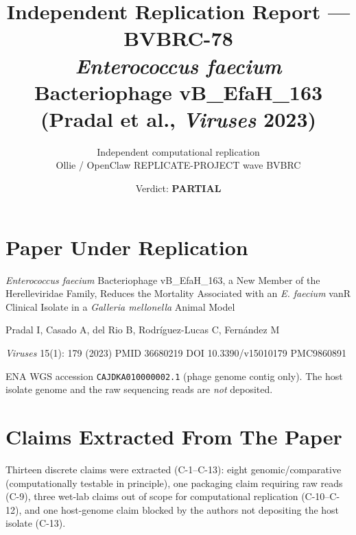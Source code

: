 \documentclass[11pt,letterpaper]{article}
\title{Independent Replication Report --- BVBRC-78\\
\large \textit{Enterococcus faecium} Bacteriophage vB\_EfaH\_163 (Pradal et al., \textit{Viruses} 2023)}
\author{Independent computational replication\\Ollie / OpenClaw REPLICATE-PROJECT wave BVBRC}
\date{Verdict: \textbf{PARTIAL}}
\begin{document}
\maketitle

\section{Paper Under Replication}

\begin{description}[leftmargin=1.3cm,style=nextline]
  \item[Title] \textit{Enterococcus faecium} Bacteriophage vB\_EfaH\_163, a New Member of the Herelleviridae Family, Reduces the Mortality Associated with an \textit{E. faecium} vanR Clinical Isolate in a \textit{Galleria mellonella} Animal Model
  \item[Authors] Pradal I, Casado A, del Rio B, Rodr\'iguez-Lucas C, Fern\'andez M
  \item[Venue] \textit{Viruses} 15(1): 179 (2023) \textbullet{} PMID 36680219 \textbullet{} DOI 10.3390/v15010179 \textbullet{} PMC9860891
  \item[Deposited data] ENA WGS accession \texttt{CAJDKA010000002.1} (phage genome contig only). The host isolate genome and the raw sequencing reads are \emph{not} deposited.
\end{description}

\section{Claims Extracted From The Paper}

Thirteen discrete claims were extracted (C-1--C-13): eight genomic/comparative (computationally testable in principle), one packaging claim requiring raw reads (C-9), three wet-lab claims out of scope for computational replication (C-10--C-12), and one host-genome claim blocked by the authors not depositing the host isolate (C-13).
\end{document}
